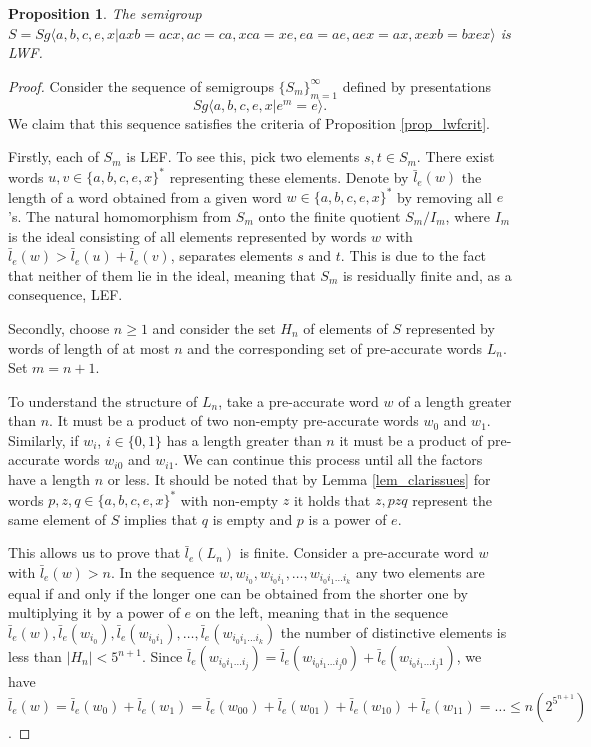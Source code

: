 \documentclass{article}
\newtheorem{proposition}{Proposition}
\theoremstyle{definition}
\begin{document}
\begin{proposition}
The semigroup $S  = Sg\langle a,b,c,e,x | axb = acx, ac =
ca, xca = xe, ea = ae, aex = ax, xexb = bxex \rangle$ is LWF.
\end{proposition}
\begin{proof}
Consider the sequence of semigroups $\{S_m\}_{m=1}^{\infty}$ defined by presentations $$Sg\langle a,b,c,e,x|e^m = e\rangle.$$ We claim that this sequence satisfies the criteria of Proposition \ref{prop_lwfcrit}.

Firstly, each of $S_m$ is LEF. To see this, pick two elements $s,t \in S_m$. There exist words $u,v \in \{a,b,c,e,x\}^*$ representing these elements. Denote by $\bar{l}_e(w)$ the length of a word obtained from a given word $w \in \{a,b,c,e,x\}^*$ by removing all $e$'s. The natural homomorphism from $S_m$ onto the finite quotient $S_m / I_m$, where $I_m$ is the ideal consisting of all elements represented by words $w$ with $\bar{l}_e(w) >\bar{l}_e(u)  + \bar{l}_e(v)$, separates elements $s$ and $t$. This is due to the fact that neither of them lie in the ideal, meaning that $S_m$ is residually finite and, as a consequence, LEF.

Secondly, choose $n \ge 1$ and consider the set $H_n$ of elements of $S$ represented by words of length of at most $n$ and the corresponding set of pre-accurate words $L_n$. Set $m = n+1$.

To understand the structure of $L_n$, take a pre-accurate word $w$ of a length greater than $n$. It must be a product of two non-empty pre-accurate words $w_0$ and $w_1$. Similarly, if $w_i$, $i \in \{0,1\}$ has a length greater than $n$ it must be a product of pre-accurate  words $w_{i0}$ and $w_{i1}$. We can continue this process until all the factors have a length $n$ or less. It should be noted that by Lemma \ref{lem_clarissues} for words $p,z,q \in \{a,b,c,e,x\}^*$ with non-empty $z$ it holds that $z,pzq $ represent the same element of $S$ implies that $q$ is empty and $p$ is a power of $e$.

This allows us to prove that $\bar{l}_e(L_n)$ is finite. Consider a pre-accurate word $w$ with $\bar{l}_e(w) > n$. In the sequence $w, w_{i_0}, w_{i_0 i_1}, \ldots , w_{i_0 i_1 \ldots i_k}$ any two elements are equal if and only if the longer one can be obtained from the shorter one by multiplying it by a power of $e$ on the left, meaning that in the sequence $\bar{l}_e(w), \bar{l}_e(w_{i_0}), \bar{l}_e(w_{i_0 i_1}), \ldots , \bar{l}_e(w_{i_0 i_1 \ldots i_k})$ the number of distinctive elements is less than $|H_n|  < 5^{n+1}$. Since $\bar{l}_e (w_{i_0 i_1 \ldots i_j}) = \bar{l}_e (w_{i_0 i_1 \ldots i_j 0}) + \bar{l}_e (w_{i_0 i_1 \ldots i_j 1})$, we have $\bar{l}_e(w) = \bar{l}_e(w_0) +  \bar{l}_e(w_1)  = \bar{l}_e(w_{00}) +  \bar{l}_e(w_{01})  + \bar{l}_e(w_{10}) +  \bar{l}_e(w_{11}) = \ldots \le n (2^{5^{n+1}})$.


\end{proof}
\end{document}
